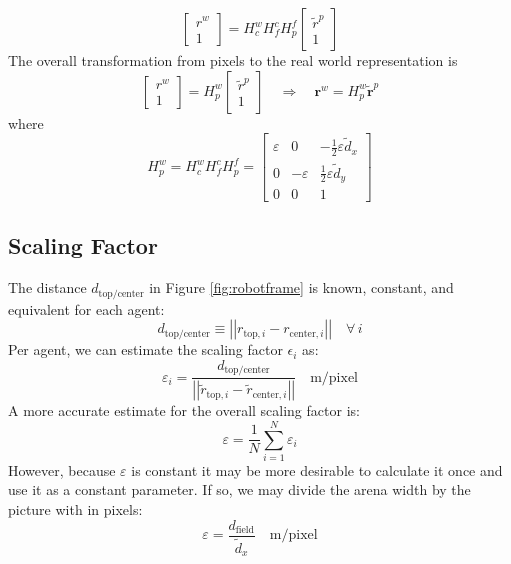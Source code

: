 \documentclass[12pt, a4paper]
{article}
\providecommand{\sub}[1]{_{\text{#1}}}
\providecommand{\subi}[1]{_{\text{#1},i}}
\providecommand{\twonorm}[1]{\left|\left|#1\right|\right|}
\providecommand{\foralli}{\quad \forall\, i}
\providecommand{\tr}{\tilde{r}}
\providecommand{\inert}{w}
\providecommand{\br}{\boldsymbol{r}}
\providecommand{\btr}{\tilde{\br}}
\begin{document}
\begin{equation}
\begin{bmatrix}
r^{\inert}\\
1
\end{bmatrix} = H^{\inert}_c H^c_f H^f_p \begin{bmatrix}
\tr^p\\1
\end{bmatrix}
\end{equation}
%
The overall transformation from pixels to the real world representation is
%
\begin{equation}
\begin{bmatrix}
r^{\inert}\\
1
\end{bmatrix} = H^{\inert}_p \begin{bmatrix}
\tr^p\\1
\end{bmatrix} \quad \Rightarrow \quad \br^{\inert} = H^{\inert}_p 
\btr^p
\end{equation}
%
where
%
\begin{equation}
H^{\inert}_p =H^{\inert}_c H^c_f H^f_p = \begin{bmatrix}
 \varepsilon&    0& -\frac{1}{2}\varepsilon \tilde{d}_x\\
   0& -\varepsilon&  \frac{1}{2}\varepsilon \tilde{d}_y\\
0&    0&           1
\end{bmatrix}
\end{equation}



\subsection{Scaling Factor}
%
The distance $d\sub{top/center}$ in Figure \ref{fig:robotframe} is known, constant, and equivalent for each agent:
%
\begin{equation}
d\sub{top/center} \equiv \twonorm{r\subi{top}-r\subi{center}} \foralli
\end{equation}
%
Per agent, we can estimate the scaling factor $\epsilon_i$ as:
%
\begin{equation}
\varepsilon_i = \dfrac{d\sub{top/center}}{\twonorm{\tr\subi{top}-\tr\subi{center}}} \quad \text{m/pixel}
\end{equation}
%
A more accurate estimate for the overall scaling factor is:
%
\begin{equation}
\varepsilon = \dfrac{1}{N}\sum^N_{i=1} \varepsilon_i
\end{equation}
%
However, because $\varepsilon$ is constant it may be more desirable to calculate it once and use it as a constant parameter. If so, we may divide the arena width by the picture with in pixels:
%
\begin{equation}
\varepsilon = \dfrac{d\sub{field}}{\tilde{d}_x} \quad \text{m/pixel}
\end{equation}
\pagebreak
\end{document}
